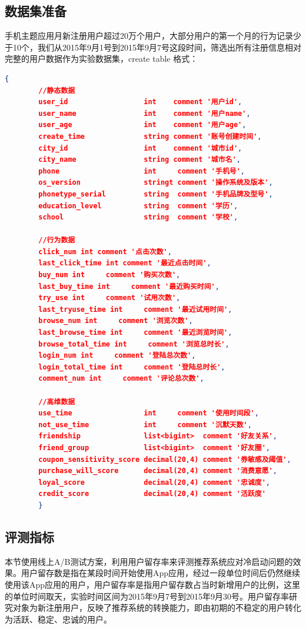       \subsection{数据集准备}
      手机主题应用月新注册用户超过20万个用户，大部分用户的第一个月的行为记录少于10个，我们从2015年9月1号到2015年9月7号这段时间，筛选出所有注册信息相对完整的用户数据作为实验数据集，create table 格式：
      \begin{lstlisting}[language=json,firstnumber=1]
        {
        //静态数据
        user_id                  int    comment '用户id',
        user_name                int    comment '用户name',
        user_age                 int    comment '用户age',
        create_time              string comment '账号创建时间',
        city_id                  int    comment '城市id',
        city_name                string comment '城市名',
        phone                    int     comment '手机号',
        os_version               stringt comment '操作系统及版本',
        phonetype_serial         string  comment '手机品牌及型号',
        education_level          string  comment '学历',
        school                   string  comment '学校',

        //行为数据
        click_num int comment '点击次数',
        last_click_time int comment '最近点击时间',
        buy_num int     comment '购买次数',
        last_buy_time int     comment '最近购买时间',
        try_use int     comment '试用次数',
        last_tryuse_time int     comment '最近试用时间',
        browse_num int     comment '浏览次数',
        last_browse_time int     comment '最近浏览时间',
        browse_total_time int     comment '浏览总时长',
        login_num int     comment '登陆总次数',
        login_total_time int     comment '登陆总时长',
        comment_num int     comment '评论总次数',

        //高维数据
        use_time                 int     comment '使用时间段',
        not_use_time             int     comment '沉默天数',
        friendship               list<bigint>  comment '好友关系',
        friend_group             list<bigint>  comment '好友圈',
        coupon_sensitivity_score decimal(20,4) comment '券敏感及阈值',
        purchase_will_score      decimal(20,4) comment '消费意愿',
        loyal_score              decimal(20,4) comment '忠诚度',
        credit_score             decimal(20,4) comment '活跃度'
        }
      \end{lstlisting}
      \subsection{评测指标}
      本节使用线上A/B测试方案\citep{ab-test}，利用用户留存率来评测推荐系统应对冷启动问题的效果。用户留存数是指在某段时间开始使用App应用，经过一段单位时间后仍然继续使用该App应用的用户，用户留存率是指用户留存数占当时新增用户的比例，这里的单位时间取天，实验时间区间为2015年9月7号到2015年9月30号。用户留存率研究对象为新注册用户，反映了推荐系统的转换能力，即由初期的不稳定的用户转化为活跃、稳定、忠诚的用户。
